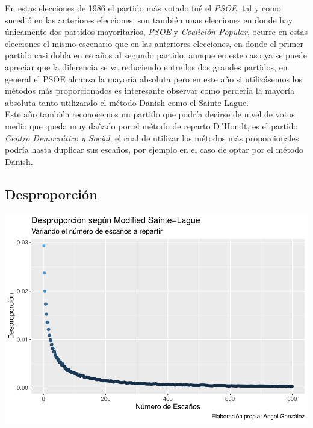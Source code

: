 \documentclass[12pt,a4paper,]{book}
\numberwithin{dummy}{section}
\theoremstyle{ocrenumbox}
\theoremstyle{blacknumex}
\theoremstyle{blacknumbox}
\theoremstyle{ocrenum}
\theoremstyle{ocrenum}
\begin{document}
En estas elecciones de 1986 el partido más votado fué el \emph{PSOE},
tal y como sucedió en las anteriores elecciones, son también unas
elecciones en donde hay únicamente dos partidos mayoritarios,
\emph{PSOE} y \emph{Coalición Popular}, ocurre en estas elecciones el
mismo escenario que en las anteriores elecciones, en donde el primer
partido casi dobla en escaños al segundo partido, aunque en este caso ya
se puede apreciar que la diferencia se va reduciendo entre los dos
grandes partidos, en general el PSOE alcanza la mayoría absoluta pero en
este año si utilizásemos los métodos más proporcionados es interesante
observar como perdería la mayoría absoluta tanto utilizando el método
Danish como el Sainte-Lague.\\
Este año también reconocemos un partido que podría decirse de nivel de
votos medio que queda muy dañado por el método de reparto D´Hondt, es el
partido \emph{Centro Democrático y Social}, el cual de utilizar los
métodos más proporcionales podría hasta duplicar sus escaños, por
ejemplo en el caso de optar por el método Danish.

\hypertarget{desproporciuxf3n-3}{%
\subsection{Desproporción}\label{desproporciuxf3n-3}}

\begin{center}\includegraphics[width=1\linewidth]{figurasR/unnamed-chunk-15-1} \end{center}
\end{document}
